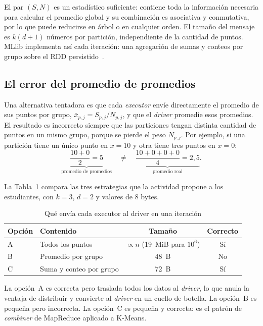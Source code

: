 \documentclass[conference,a4paper]{IEEEtran}
\begin{document}
El par $(S, N)$ es un estadístico suficiente: contiene toda la información necesaria para calcular el promedio global y su combinación es asociativa y conmutativa, por lo que puede reducirse en árbol o en cualquier orden. El tamaño del mensaje es $k(d+1)$ números por partición, independiente de la cantidad de puntos. MLlib implementa así cada iteración: una agregación de sumas y conteos por grupo sobre el RDD persistido~\cite{meng2016mllib}.

\subsection{El error del promedio de promedios}

Una alternativa tentadora es que cada \textit{executor} envíe directamente el promedio de sus puntos por grupo, $\bar{x}_{p,j} = S_{p,j}/N_{p,j}$, y que el \textit{driver} promedie esos promedios. El resultado es incorrecto siempre que las particiones tengan distinta cantidad de puntos en un mismo grupo, porque se pierde el peso $N_{p,j}$. Por ejemplo, si una partición tiene un único punto en $x=10$ y otra tiene tres puntos en $x=0$:
\begin{equation}
\underbrace{\frac{10 + 0}{2} = 5}_{\text{promedio de promedios}}
\quad\neq\quad
\underbrace{\frac{10 + 0 + 0 + 0}{4} = 2{,}5}_{\text{promedio real}} .
\end{equation}

La Tabla~\ref{tab:mensajes} compara las tres estrategias que la actividad propone a los estudiantes, con $k=3$, $d=2$ y valores de 8 bytes.

\begin{table}[t]
\caption{Qué envía cada executor al driver en una iteración}
\label{tab:mensajes}
\centering
\begin{tabular}{@{}l>{\raggedright\arraybackslash}p{2.2cm}cc@{}}
\toprule
\textbf{Opción} & \textbf{Contenido} & \textbf{Tamaño} & \textbf{Correcto} \\
\midrule
A & Todos los puntos & $\propto n$ (19~MiB para $10^6$) & Sí \\
B & Promedio por grupo & 48~B & No \\
C & Suma y conteo por grupo & 72~B & Sí \\
\bottomrule
\end{tabular}
\end{table}

La opción~A es correcta pero traslada todos los datos al \textit{driver}, lo que anula la ventaja de distribuir y convierte al \textit{driver} en un cuello de botella. La opción~B es pequeña pero incorrecta. La opción~C es pequeña y correcta: es el patrón de \textit{combiner} de MapReduce aplicado a K-Means.
\end{document}

